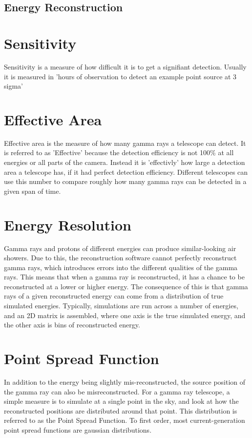 \subsection{Energy Reconstruction}\label{subsec:enrecon}

\section{Sensitivity}
Sensitivity is a measure of how difficult it is to get a signifiant detection.
Usually it is measured in 'hours of observation to detect an example point source at 3 sigma'

\section{Effective Area}
Effective area is the measure of how many gamma rays a telescope can detect.
It is referred to as 'Effective' because the detection efficiency is not 100\% at all energies or all parts of the camera.
Instead it is 'effectivly' how large a detection area a telescope has, if it had perfect detection efficiency.
Different telescopes can use this number to compare roughly how many gamma rays can be detected in a given span of time.

\section{Energy Resolution}
Gamma rays and protons of different energies can produce similar-looking air showers.
Due to this, the reconstruction software cannot perfectly reconstruct gamma rays, which introduces errors into the different qualities of the gamma rays.
This means that when a gamma ray is reconstructed, it has a chance to be reconstructed at a lower or higher energy.
The consequence of this is that gamma rays of a given reconstructed energy can come from a distribution of true simulated energies.
Typically, simulations are run across a number of energies, and an 2D matrix is assembled, where one axis is the true simulated energy, and the other axis is bins of reconstructed energy.


\section{Point Spread Function}
In addition to the energy being slightly mis-reconstructed, the source position of the gamma ray can also be misreconstructed.
For a gamma ray telescope, a simple measure is to simulate at a single point in the sky, and look at how the reconstructed positions are distributed around that point.
This distribution is referred to as the Point Spread Function.
To first order, most current-generation point spread functions are gaussian distributions.


